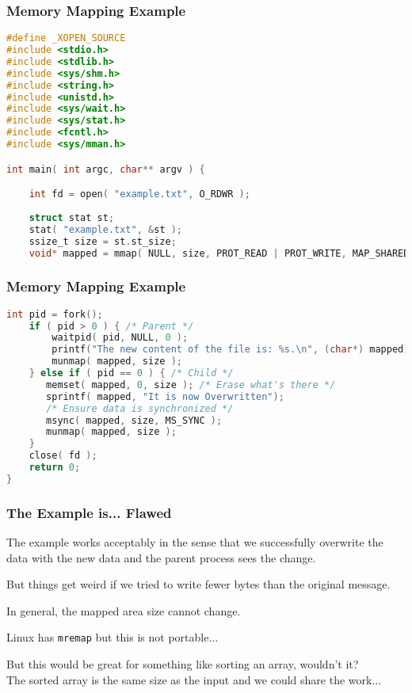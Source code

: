 \begin{frame}[fragile]
	\frametitle{Memory Mapping Example}

	\begin{lstlisting}[language=C]
#define _XOPEN_SOURCE
#include <stdio.h>
#include <stdlib.h>
#include <sys/shm.h>
#include <string.h>
#include <unistd.h>
#include <sys/wait.h>
#include <sys/stat.h>
#include <fcntl.h>
#include <sys/mman.h>

int main( int argc, char** argv ) { 

    int fd = open( "example.txt", O_RDWR );
    
    struct stat st; 
    stat( "example.txt", &st );
    ssize_t size = st.st_size;
    void* mapped = mmap( NULL, size, PROT_READ | PROT_WRITE, MAP_SHARED, fd, 0 );  
\end{lstlisting}
\end{frame}

\begin{frame}[fragile]
	\frametitle{Memory Mapping Example}

	\begin{lstlisting}[language=C]
    int pid = fork();
    if ( pid > 0 ) { /* Parent */
        waitpid( pid, NULL, 0 );
        printf("The new content of the file is: %s.\n", (char*) mapped);
        munmap( mapped, size );
    } else if ( pid == 0 ) { /* Child */
       memset( mapped, 0, size ); /* Erase what's there */
       sprintf( mapped, "It is now Overwritten");
       /* Ensure data is synchronized */
       msync( mapped, size, MS_SYNC );
       munmap( mapped, size );
    }
    close( fd );
    return 0;
}
\end{lstlisting}

\end{frame}

\begin{frame}
	\frametitle{The Example is... Flawed}

	The example works acceptably in the sense that we successfully overwrite the data with the new data and the parent process sees the change.

	But things get weird if we tried to write fewer bytes than the original message.

	In general, the mapped area size cannot change.

	Linux has \texttt{mremap} but this is not portable...

	But this would be great for something like sorting an array, wouldn't it?\\
	\quad The sorted array is the same size as the input and we could share the work...

\end{frame}







